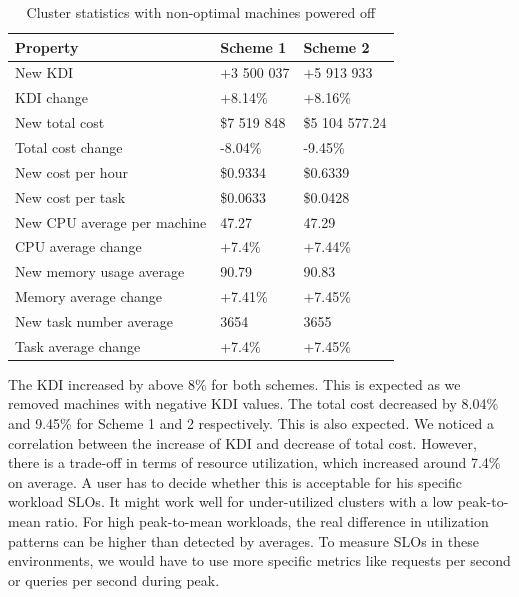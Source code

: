 \documentclass[]{final_report}
\begin{document}
\begin{table}[h]
\begin{center}
    \begin{tabular}{| l | l | l |}
    \hline
    \textbf{Property} & \textbf{Scheme 1} & \textbf{Scheme 2} \\
    \hline
    New KDI & +3 500 037 & +5 913 933 \\
    \hline
    KDI change & +8.14\% & +8.16\% \\
    \hline
    New total cost & \$7 519 848 & \$5 104 577.24 \\
    \hline
    Total cost change & -8.04\% & -9.45\% \\
    \hline
    New cost per hour & \$0.9334 & \$0.6339 \\
    \hline
    New cost per task & \$0.0633  & \$0.0428 \\
    \hline
    New CPU average per machine & 47.27 & 47.29 \\
    \hline
    CPU average change & +7.4\% & +7.44\% \\
    \hline
    New memory usage average & 90.79 & 90.83 \\
    \hline
    Memory average change & +7.41\% & +7.45\% \\
    \hline
    New task number average & 3654 & 3655 \\
    \hline
    Task average change & +7.4\% & +7.45\% \\
    \hline
    \end{tabular}
\end{center}
\caption{Cluster statistics with non-optimal machines powered off}
\label{tab:squeeze-them-in}
\end{table}

The KDI increased by above 8\% for both schemes. This is expected as we removed machines with negative KDI values. The total cost decreased by 8.04\% and 9.45\% for Scheme 1 and 2 respectively. This is also expected. We noticed a correlation between the increase of KDI and decrease of total cost. However, there is a trade-off in terms of resource utilization, which increased around 7.4\% on average. A user has to decide whether this is acceptable for his specific workload SLOs. It might work well for under-utilized clusters with a low peak-to-mean ratio. For high peak-to-mean workloads, the real difference in utilization patterns can be higher than detected by averages. To measure SLOs in these environments, we would have to use more specific metrics like requests per second or queries per second during peak. 
\end{document}
